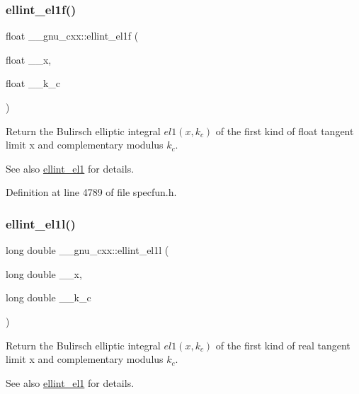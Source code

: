 \subsubsection{\texorpdfstring{ellint\+\_\+el1f()}{ellint\_el1f()}}
{\footnotesize\ttfamily float \+\_\+\+\_\+gnu\+\_\+cxx\+::ellint\+\_\+el1f (\begin{DoxyParamCaption}\item[{float}]{\+\_\+\+\_\+x,  }\item[{float}]{\+\_\+\+\_\+k\+\_\+c }\end{DoxyParamCaption})\hspace{0.3cm}{\ttfamily [inline]}}

Return the Bulirsch elliptic integral $ el1(x,k_c) $ of the first kind of {\ttfamily float} tangent limit {\ttfamily x} and complementary modulus $ k_c $.

\begin{DoxySeeAlso}{See also}
\hyperlink{group__mathsf__gnu_ga510b1e51e7d3bc937ed1b4c2f57492e4}{ellint\+\_\+el1} for details. 
\end{DoxySeeAlso}


Definition at line 4789 of file specfun.\+h.

\mbox{\label{group__mathsf__gnu_gaeed1201e421be410460739048cba5cd8}} 
\subsubsection{\texorpdfstring{ellint\+\_\+el1l()}{ellint\_el1l()}}
{\footnotesize\ttfamily long double \+\_\+\+\_\+gnu\+\_\+cxx\+::ellint\+\_\+el1l (\begin{DoxyParamCaption}\item[{long double}]{\+\_\+\+\_\+x,  }\item[{long double}]{\+\_\+\+\_\+k\+\_\+c }\end{DoxyParamCaption})\hspace{0.3cm}{\ttfamily [inline]}}

Return the Bulirsch elliptic integral $ el1(x,k_c) $ of the first kind of real tangent limit {\ttfamily x} and complementary modulus $ k_c $.

\begin{DoxySeeAlso}{See also}
\hyperlink{group__mathsf__gnu_ga510b1e51e7d3bc937ed1b4c2f57492e4}{ellint\+\_\+el1} for details. 
\end{DoxySeeAlso}



